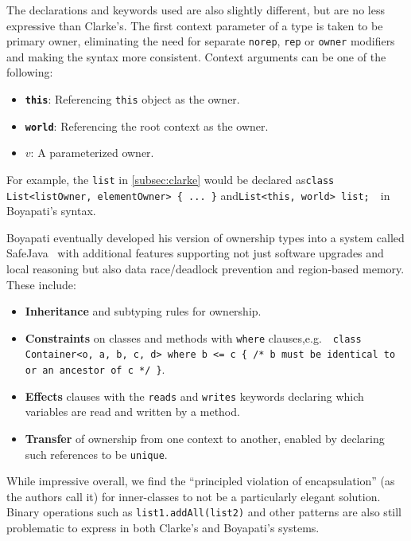 \documentclass{acm_proc_article-sp}
\begin{document}
The declarations and keywords used are also slightly different, but are no less
expressive than Clarke's. The first context parameter of a type is taken to be
primary owner, eliminating the need for separate \lstinline|norep|,
\lstinline|rep| or \lstinline|owner| modifiers and making the syntax more
consistent. Context arguments can be one of the following:
\begin{itemize}
	\item \textbf{\lstinline|this|}:
		Referencing \lstinline|this| object as the owner.
	\item \textbf{\lstinline|world|}:
		Referencing the root context as the owner.
	\item \textbf{$v$}:
		A parameterized owner.
\end{itemize}

For example, the \lstinline|list| in \cref{subsec:clarke} would be declared
as\linebreak\lstinline|class List<listOwner, elementOwner> { ... }|
and\linebreak\lstinline|List<this, world> list;|~~in Boyapati's syntax.

Boyapati eventually developed his version of ownership types into a system
called SafeJava~\cite{boyapati04safejava} with additional features supporting
not just software upgrades and local reasoning but also data race/deadlock
prevention and region-based memory. These include:
\begin{itemize}
	\item \textbf{Inheritance} and subtyping rules for ownership.
	\item \textbf{Constraints} on classes and methods with \lstinline|where|
clauses,\linebreak e.g.~~\lstinline|class Container<o, a, b, c, d> where b <= c { /* b must be identical to or an ancestor of c */ }|.
	\item \textbf{Effects} clauses with the \lstinline|reads| and
\lstinline|writes| keywords declaring which variables are read and written by a
method.
	\item \textbf{Transfer} of ownership from one context to another, enabled by
declaring such references to be \lstinline|unique|.
\end{itemize}

While impressive overall, we find the ``principled violation of encapsulation''
(as the authors call it) for inner-classes to not be a particularly elegant
solution. Binary operations such as \linebreak\lstinline|list1.addAll(list2)|
and other patterns are also still problematic to express in both Clarke's and
Boyapati's systems.
\end{document}
